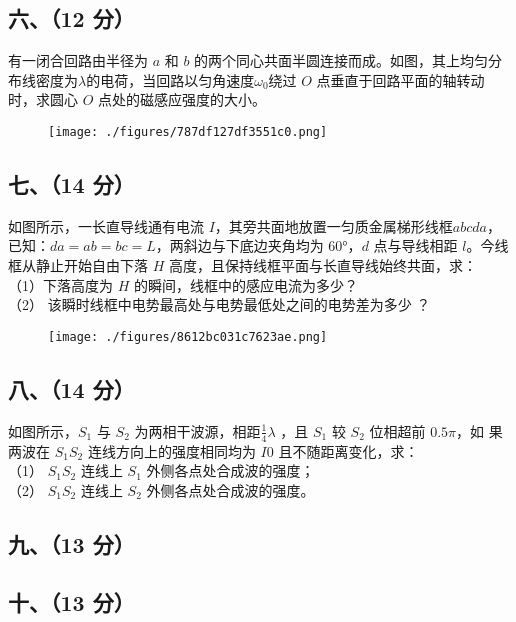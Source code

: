 \subsection{六、（12 分）}
有一闭合回路由半径为 $a$ 和 $b$ 的两个同心共面半圆连接而成。如图，其上均匀分布线密度为$\lambda$的电荷，当回路以匀角速度$\omega_0$绕过 $O$ 点垂直于回路平面的轴转动时，求圆心 $O$ 点处的磁感应强度的大小。
\begin{figure}[ht]
\centering
\texttt{[image: ./figures/787df127df3551c0.png]}
\caption{} \label{fig_NJUD4_5}
\end{figure}
\subsection{七、（14 分）}
如图所示，一长直导线通有电流 $I$，其旁共面地放置一匀质金属梯形线框$abcda$，已知：$da=ab=bc=L$，两斜边与下底边夹角均为 60°，$d$ 点与导线相距 $l$。今线框从静止开始自由下落 $H$ 高度，且保持线框平面与长直导线始终共面，求：\\
（1）下落高度为 $H$ 的瞬间，线框中的感应电流为多少？\\
（2） 该瞬时线框中电势最高处与电势最低处之间的电势差为多少 ？
\begin{figure}[ht]
\centering
\texttt{[image: ./figures/8612bc031c7623ae.png]}
\caption{} \label{fig_NJUD4_6}
\end{figure}
\subsection{八、（14 分）}
如图所示，$S_1$ 与 $S_2$ 为两相干波源，相距$\frac{1}{4}\lambda$ ，且 $S_1$ 较 $S_2$ 位相超前 $0.5\pi$，如
果两波在 $S_1S_2$ 连线方向上的强度相同均为 $I0$ 且不随距离变化，求：\\
（1） $S_1S_2$ 连线上 $S_1$ 外侧各点处合成波的强度；\\
（2） $S_1S_2$ 连线上 $S_2$ 外侧各点处合成波的强度。
\subsection{九、（13 分）}

\subsection{十、（13 分）}